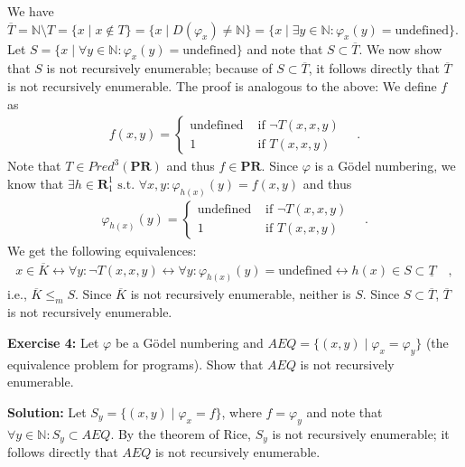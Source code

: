 \documentclass [11pt]{article}
\newcommand{\N}{\ensuremath{\mathbb{N}}}
\newcommand{\PR}{\textbf{PR}}
\newcommand{\R}{\textbf{R}}
\newcommand{\lra}{\ensuremath{\leftrightarrow}}
\begin{document}
We have $\overline{T} = \N\setminus T = \{x\mid x \not \in T \} = \{x\mid D(\varphi_x) \neq \N\} = \{x \mid \exists y \in \N: \varphi_x(y) = \text{undefined}\}$. 
Let $S = \{x\mid \forall y\in \N: \varphi_x(y) = \text{undefined}\}$ and note that $S \subset \overline{T}$.
We now show that $S$ is not recursively enumerable; because of $S \subset \overline{T}$, it follows directly that $\overline{T}$ is not recursively enumerable.
The proof is analogous to the above:
We define $f$ as 
\begin{align*}
 f(x,y) = \begin{cases}
           \text{undefined} & \text{ if } \neg T(x,x,y) \\
           1 &\text{ if } T(x,x,y)
          \end{cases} \quad .
\end{align*} 
Note that $T \in Pred^3(\PR)$ and thus $f \in \PR$.
Since $\varphi$ is a G\"odel numbering, we know that $\exists h \in \R_1^1 \text{ s.t.\ } \forall x,y :\varphi_{h(x)}(y) = f(x,y)$ and thus
\begin{align*}
\varphi_{h(x)}(y) = \begin{cases}
           \text{undefined} & \text{ if } \neg T(x,x,y) \\
           1 &\text{ if } T(x,x,y)
          \end{cases} \quad .
\end{align*} 
We get the following equivalences:
\begin{align*}
x\in \overline{K} \lra \forall y: \neg T(x,x,y) \lra \forall y: \varphi_{h(x)}(y) = \text{undefined} \lra h(x) \in S \subset \underline{T} \quad , 
\end{align*}
i.e., $\overline{K} \leq_m S$. 
Since $\overline{K}$ is not recursively enumerable, neither is $S$.
Since $S \subset \overline{T}$, $\overline{T}$ is not recursively enumerable.

\bigskip
\noindent
\textbf{Exercise 4:} Let $\varphi$ be a G\"odel numbering and $AEQ = \{(x,y) \mid \varphi_x = \varphi_y \}$ (the equivalence problem for programs). Show that $AEQ$ is not recursively enumerable.

\noindent
\textbf{Solution:}
Let $S_y = \{ (x,y) \mid \varphi_x = f \}$, where $f = \varphi_y$ and note that $\forall y\in \N: S_y \subset AEQ$.
By the theorem of Rice,  $S_y$ is not recursively enumerable; it follows directly that $AEQ$ is not recursively enumerable.
\end{document}
